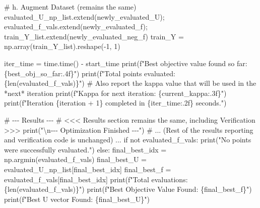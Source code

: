 \documentclass[
  letterpaper,
  DIV=11,
  numbers=noendperiod]{scrartcl}
\newenvironment{Shaded}{\begin{snugshade}}{\end{snugshade}}
\newcommand{\BuiltInTok}[1]{\textcolor[rgb]{0.00,0.23,0.31}{#1}}
\newcommand{\CharTok}[1]{\textcolor[rgb]{0.13,0.47,0.30}{#1}}
\newcommand{\CommentTok}[1]{\textcolor[rgb]{0.37,0.37,0.37}{#1}}
\newcommand{\ControlFlowTok}[1]{\textcolor[rgb]{0.00,0.23,0.31}{#1}}
\newcommand{\DecValTok}[1]{\textcolor[rgb]{0.68,0.00,0.00}{#1}}
\newcommand{\KeywordTok}[1]{\textcolor[rgb]{0.00,0.23,0.31}{#1}}
\newcommand{\NormalTok}[1]{\textcolor[rgb]{0.00,0.23,0.31}{#1}}
\newcommand{\OperatorTok}[1]{\textcolor[rgb]{0.37,0.37,0.37}{#1}}
\newcommand{\SpecialCharTok}[1]{\textcolor[rgb]{0.37,0.37,0.37}{#1}}
\newcommand{\SpecialStringTok}[1]{\textcolor[rgb]{0.13,0.47,0.30}{#1}}
\newcommand{\StringTok}[1]{\textcolor[rgb]{0.13,0.47,0.30}{#1}}
\begin{document}
\begin{Shaded}
\begin{Highlighting}[]
    \CommentTok{\# h. Augment Dataset (remains the same)}
\NormalTok{    evaluated\_U\_np\_list.extend(newly\_evaluated\_U)}\OperatorTok{;}\NormalTok{ evaluated\_f\_vals.extend(newly\_evaluated\_f)}\OperatorTok{;}\NormalTok{ train\_Y\_list.extend(newly\_evaluated\_neg\_f)}
\NormalTok{    train\_Y }\OperatorTok{=}\NormalTok{ np.array(train\_Y\_list).reshape(}\OperatorTok{{-}}\DecValTok{1}\NormalTok{, }\DecValTok{1}\NormalTok{)}

\NormalTok{    iter\_time }\OperatorTok{=}\NormalTok{ time.time() }\OperatorTok{{-}}\NormalTok{ start\_time}
    \BuiltInTok{print}\NormalTok{(}\SpecialStringTok{f"Best objective value found so far: }\SpecialCharTok{\{}\NormalTok{best\_obj\_so\_far}\SpecialCharTok{:.4f\}}\SpecialStringTok{"}\NormalTok{)}
    \BuiltInTok{print}\NormalTok{(}\SpecialStringTok{f"Total points evaluated: }\SpecialCharTok{\{}\BuiltInTok{len}\NormalTok{(evaluated\_f\_vals)}\SpecialCharTok{\}}\SpecialStringTok{"}\NormalTok{)}
    \CommentTok{\# Also report the kappa value that will be used in the *next* iteration}
    \BuiltInTok{print}\NormalTok{(}\SpecialStringTok{f"Kappa for next iteration: }\SpecialCharTok{\{}\NormalTok{current\_kappa}\SpecialCharTok{:.3f\}}\SpecialStringTok{"}\NormalTok{)}
    \BuiltInTok{print}\NormalTok{(}\SpecialStringTok{f"Iteration }\SpecialCharTok{\{}\NormalTok{iteration }\OperatorTok{+} \DecValTok{1}\SpecialCharTok{\}}\SpecialStringTok{ completed in }\SpecialCharTok{\{}\NormalTok{iter\_time}\SpecialCharTok{:.2f\}}\SpecialStringTok{ seconds."}\NormalTok{)}


\CommentTok{\# {-}{-}{-} Results {-}{-}{-}}
\CommentTok{\# \textless{}\textless{}\textless{} Results section remains the same, including Verification \textgreater{}\textgreater{}\textgreater{}}
\BuiltInTok{print}\NormalTok{(}\StringTok{"}\CharTok{\textbackslash{}n}\StringTok{{-}{-}{-} Optimization Finished {-}{-}{-}"}\NormalTok{)}
\CommentTok{\# ... (Rest of the results reporting and verification code is unchanged) ...}
\ControlFlowTok{if} \KeywordTok{not}\NormalTok{ evaluated\_f\_vals: }\BuiltInTok{print}\NormalTok{(}\StringTok{"No points were successfully evaluated."}\NormalTok{)}
\ControlFlowTok{else}\NormalTok{:}
\NormalTok{    final\_best\_idx }\OperatorTok{=}\NormalTok{ np.argmin(evaluated\_f\_vals)}
\NormalTok{    final\_best\_U }\OperatorTok{=}\NormalTok{ evaluated\_U\_np\_list[final\_best\_idx]}
\NormalTok{    final\_best\_f }\OperatorTok{=}\NormalTok{ evaluated\_f\_vals[final\_best\_idx]}
    \BuiltInTok{print}\NormalTok{(}\SpecialStringTok{f"Total evaluations: }\SpecialCharTok{\{}\BuiltInTok{len}\NormalTok{(evaluated\_f\_vals)}\SpecialCharTok{\}}\SpecialStringTok{"}\NormalTok{)}
    \BuiltInTok{print}\NormalTok{(}\SpecialStringTok{f"Best Objective Value Found: }\SpecialCharTok{\{}\NormalTok{final\_best\_f}\SpecialCharTok{\}}\SpecialStringTok{"}\NormalTok{)}
    \BuiltInTok{print}\NormalTok{(}\SpecialStringTok{f"Best U vector Found: }\SpecialCharTok{\{}\NormalTok{final\_best\_U}\SpecialCharTok{\}}\SpecialStringTok{"}\NormalTok{)}


\end{Highlighting}
\end{Shaded}
\end{document}
